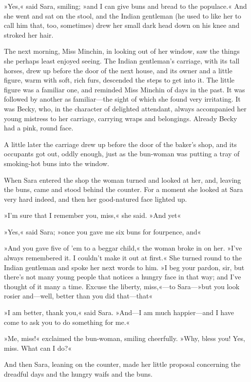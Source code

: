 »Yes,« said Sara, smiling; »and I can give buns and bread to the populace.« And she went and sat on the stool, and the Indian gentleman (he used to like her to call him that, too, sometimes) drew her small dark head down on his knee and stroked her hair.

The next morning, Miss Minchin, in looking out of her window, saw the things she perhaps least enjoyed seeing. The Indian gentleman's carriage, with its tall horses, drew up before the door of the next house, and its owner and a little figure, warm with soft, rich furs, descended the steps to get into it. The little figure was a familiar one, and reminded Miss Minchin of days in the past. It was followed by another as familiar—the sight of which she found very irritating. It was Becky, who, in the character of delighted attendant, always accompanied her young mistress to her carriage, carrying wraps and belongings. Already Becky had a pink, round face.

A little later the carriage drew up before the door of the baker's shop, and its occupants got out, oddly enough, just as the bun-woman was putting a tray of smoking-hot buns into the window.

When Sara entered the shop the woman turned and looked at her, and, leaving the buns, came and stood behind the counter. For a moment she looked at Sara very hard indeed, and then her good-natured face lighted up.

»I'm sure that I remember you, miss,« she said. »And yet\longdash«

»Yes,« said Sara; »once you gave me six buns for fourpence, and\longdash«

»And you gave five of 'em to a beggar child,« the woman broke in on her. »I've always remembered it. I couldn't make it out at first.« She turned round to the Indian gentleman and spoke her next words to him. »I beg your pardon, sir, but there's not many young people that notices a hungry face in that way; and I've thought of it many a time. Excuse the liberty, miss,«—to Sara—»but you look rosier and—well, better than you did that—that\longdash«

»I am better, thank you,« said Sara. »And—I am much happier—and I have come to ask you to do something for me.«

»Me, miss!« exclaimed the bun-woman, smiling cheerfully. »Why, bless you! Yes, miss. What can I do?«

And then Sara, leaning on the counter, made her little proposal concerning the dreadful days and the hungry waifs and the buns.

